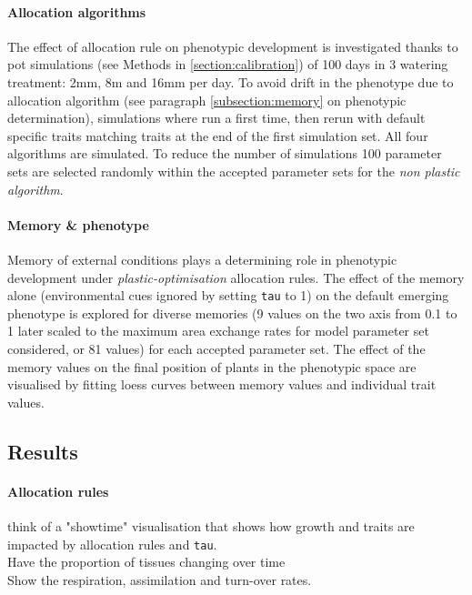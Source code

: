 \paragraph{Allocation algorithms}
The effect of allocation rule on phenotypic development is investigated thanks to pot simulations (see Methods in \ref{section:calibration}) of 100 days in 3 watering treatment: 2mm, 8m and 16mm per day. To avoid drift in the phenotype due to allocation algorithm (see paragraph \ref{subsection:memory} on phenotypic determination), simulations where run a first time, then rerun with default specific traits matching traits at the end of the first simulation set. All four algorithms are simulated. To reduce the number of simulations 100 parameter sets are selected randomly within the accepted parameter sets for the \textit{non plastic algorithm}.

\paragraph{Memory \& phenotype}
Memory of external conditions plays a determining role in phenotypic development under \textit{plastic-optimisation} allocation rules. The effect of the memory alone (environmental cues ignored by setting \texttt{tau} to 1) on the default emerging phenotype is explored for diverse memories (9 values on the two axis from 0.1 to 1 later scaled to the maximum area exchange rates for model parameter set considered, or 81 values) for each accepted parameter set. The effect of the memory values on the final position of plants in the phenotypic space are visualised by fitting loess curves between memory values and individual trait values.

\subsection{Results}

\paragraph{Allocation rules}
think of a "showtime" visualisation that shows how growth and traits are impacted by allocation rules and \texttt{tau}.\\

Have the proportion of tissues changing over time\\

Show the respiration, assimilation and turn-over rates.\\ 

